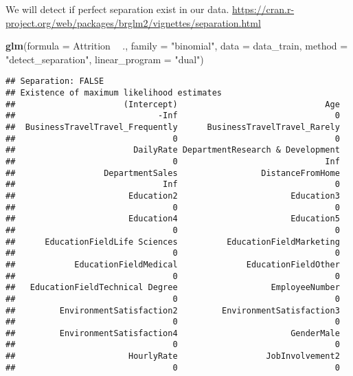 \documentclass[
]{article}
\newenvironment{Shaded}{\begin{snugshade}}{\end{snugshade}}
\newcommand{\DataTypeTok}[1]{\textcolor[rgb]{0.13,0.29,0.53}{#1}}
\newcommand{\KeywordTok}[1]{\textcolor[rgb]{0.13,0.29,0.53}{\textbf{#1}}}
\newcommand{\NormalTok}[1]{#1}
\newcommand{\OperatorTok}[1]{\textcolor[rgb]{0.81,0.36,0.00}{\textbf{#1}}}
\newcommand{\StringTok}[1]{\textcolor[rgb]{0.31,0.60,0.02}{#1}}
\begin{document}
We will detect if perfect separation exist in our data.
\url{https://cran.r-project.org/web/packages/brglm2/vignettes/separation.html}

\begin{Shaded}
\begin{Highlighting}[]
\KeywordTok{glm}\NormalTok{(}\DataTypeTok{formula =}\NormalTok{ Attrition }\OperatorTok{~}\StringTok{ }\NormalTok{., }\DataTypeTok{family =} \StringTok{"binomial"}\NormalTok{, }\DataTypeTok{data =}\NormalTok{ data_train, }\DataTypeTok{method =} \StringTok{"detect_separation"}\NormalTok{, }\DataTypeTok{linear_program =} \StringTok{"dual"}\NormalTok{)}
\end{Highlighting}
\end{Shaded}

\begin{verbatim}
## Separation: FALSE 
## Existence of maximum likelihood estimates
##                      (Intercept)                              Age 
##                             -Inf                                0 
##  BusinessTravelTravel_Frequently      BusinessTravelTravel_Rarely 
##                                0                                0 
##                        DailyRate DepartmentResearch & Development 
##                                0                              Inf 
##                  DepartmentSales                 DistanceFromHome 
##                              Inf                                0 
##                       Education2                       Education3 
##                                0                                0 
##                       Education4                       Education5 
##                                0                                0 
##      EducationFieldLife Sciences          EducationFieldMarketing 
##                                0                                0 
##            EducationFieldMedical              EducationFieldOther 
##                                0                                0 
##   EducationFieldTechnical Degree                   EmployeeNumber 
##                                0                                0 
##         EnvironmentSatisfaction2         EnvironmentSatisfaction3 
##                                0                                0 
##         EnvironmentSatisfaction4                       GenderMale 
##                                0                                0 
##                       HourlyRate                  JobInvolvement2 
##                                0                                0 

\end{verbatim}
\end{document}
